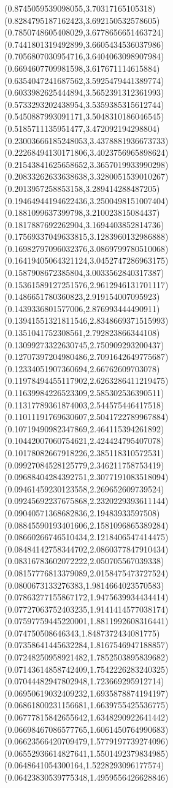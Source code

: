 {(0.8745059539098055,3.70317165105318)
(0.8284795187162423,3.692150532578605)
(0.7850748605408029,3.6778656651463724)
(0.7441801319492899,3.6605434536037986)
(0.7056807030954716,3.6404063098907984)
(0.6694607709981598,3.617671114615884)
(0.6354047241687562,3.5925479441389774)
(0.6033982625444894,3.5652391312361993)
(0.5733293202438954,3.5359385315612744)
(0.5450887993091171,3.5048310186046545)
(0.5185711135951477,3.472092194298804)
(0.23003666185248053,3.4378881936673733)
(0.22268494130171806,3.4023756965898624)
(0.21543841625658652,3.3657019933990298)
(0.20833262633638638,3.3280051539010267)
(0.2013957258853158,3.289414288487205)
(0.19464944194622436,3.2500498151007404)
(0.1881099637399798,3.210023815084437)
(0.1817887692262904,3.1694403852814736)
(0.17569337049633815,3.1283960132986888)
(0.16982797096032376,3.0869799780510068)
(0.16419405064321124,3.0452747286963175)
(0.1587908672385804,3.0033562840317387)
(0.15361589127251576,2.9612946131701117)
(0.1486651780360823,2.919154007095923)
(0.1439336801577006,2.876993444490911)
(0.13941551321811546,2.8348669371515993)
(0.1351041752308561,2.792823866344108)
(0.13099273322630745,2.750909293200437)
(0.12707397204980486,2.7091642649775687)
(0.12334051907360694,2.66762609703078)
(0.11978494455117902,2.6263286411219475)
(0.11639984226523309,2.585302536390511)
(0.11317789361874003,2.544575446417518)
(0.11011191769630607,2.5041722789967884)
(0.10719490982347869,2.464115394261892)
(0.10442007060754621,2.424424795407078)
(0.10178082667918226,2.385118310572531)
(0.09927084528125779,2.346211758753419)
(0.09688404284392751,2.3077191083518094)
(0.09461459230123558,2.269652609739524)
(0.09245692237675868,2.2320229393611144)
(0.09040571368682836,2.19483933597508)
(0.08845590193401606,2.1581096865389284)
(0.08660266746510434,2.1218406547414475)
(0.08484142758344702,2.0860377847910434)
(0.08316783602072222,2.050705567039338)
(0.08157776813379089,2.0158475473727524)
(0.0800673133276383,1.9814664023570583)
(0.07863277155867172,1.9475639934434414)
(0.07727063752403235,1.9141414577038174)
(0.07597759445220001,1.8811992608316441)
(0.074750508646343,1.8487372434081775)
(0.07358641445632284,1.8167546947188857)
(0.07248250958921482,1.7852503895839682)
(0.07143614858742409,1.7542226283240325)
(0.07044482947802948,1.723669295912714)
(0.06950619032409232,1.6935878874194197)
(0.06861800231156681,1.6639755425536775)
(0.06777815842655642,1.6348290922641442)
(0.06698467086577765,1.6061450764990683)
(0.06623566420709479,1.5779197739274096)
(0.06552936614827641,1.5501492379834985)
(0.0648641054300164,1.5228293096177574)
(0.06423830539775348,1.4959556426628846)
}
